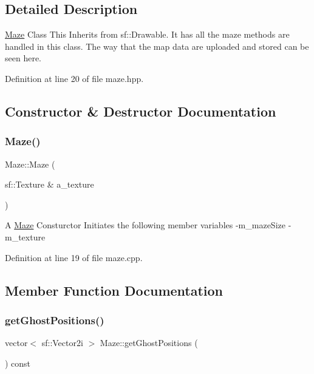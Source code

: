 \subsection{Detailed Description}
\hyperlink{class_maze}{Maze} Class This Inherits from sf\+::\+Drawable. It has all the maze methods are handled in this class. The way that the map data are uploaded and stored can be seen here. 

Definition at line 20 of file maze.\+hpp.



\subsection{Constructor \& Destructor Documentation}
\mbox{\label{class_maze_a7d8ebd5ec031891fcb2d76d5b8502e44}} 
\subsubsection{\texorpdfstring{Maze()}{Maze()}}
{\footnotesize\ttfamily Maze\+::\+Maze (\begin{DoxyParamCaption}\item[{sf\+::\+Texture \&}]{a\+\_\+texture }\end{DoxyParamCaption})}

A \hyperlink{class_maze}{Maze} Consturctor Initiates the following member variables -\/m\+\_\+maze\+Size -\/m\+\_\+texture 

Definition at line 19 of file maze.\+cpp.



\subsection{Member Function Documentation}
\mbox{\label{class_maze_aaf1dc338270b2674df3f5477a512b0a3}} 
\subsubsection{\texorpdfstring{get\+Ghost\+Positions()}{getGhostPositions()}}
{\footnotesize\ttfamily vector$<$ sf\+::\+Vector2i $>$ Maze\+::get\+Ghost\+Positions (\begin{DoxyParamCaption}{ }\end{DoxyParamCaption}) const}

